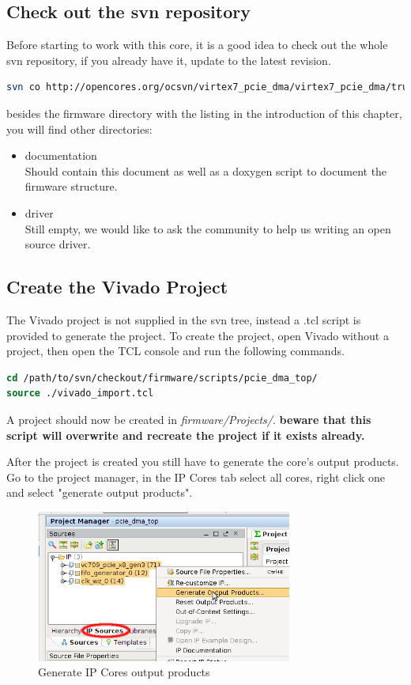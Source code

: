 \subsection{Check out the svn repository}
Before starting to work with this core, it is a good idea to check out the whole svn repository, if you already have it, update to the latest revision.
\begin{lstlisting}[frame=single, language=Bash, caption=svn checkout]
svn co http://opencores.org/ocsvn/virtex7_pcie_dma/virtex7_pcie_dma/trunk 
\end{lstlisting}
besides the firmware directory with the listing in the introduction of this chapter, you will find other directories:\\
\begin{itemize}
\item documentation\\Should contain this document as well as a doxygen script to document the firmware structure.
\item driver\\Still empty, we would like to ask the community to help us writing an open source driver.
\end{itemize}

\subsection{Create the Vivado Project}
The Vivado project is not supplied in the svn tree, instead a .tcl script is provided to generate the project. To create the project, open Vivado without a project, then open the TCL console and run the following commands.
\begin{lstlisting}[frame=single, language=tcl,     caption=Create Vivado Project]
cd /path/to/svn/checkout/firmware/scripts/pcie_dma_top/
source ./vivado_import.tcl
\end{lstlisting}
A project should now be created in \textit{firmware/Projects/}. \textbf{beware that this script will overwrite and recreate the project if it exists already.}

After the project is created you still have to generate the core's output products. Go to the project manager, in the IP Cores tab select all cores, right click one and select "generate output products".
\begin{figure}[H]
\centering
\includegraphics[width=0.75\textwidth]{pictures/generate_output_products.png}
\caption{Generate IP Cores output products}
\label{fig:generate_output_products}
\end{figure}
